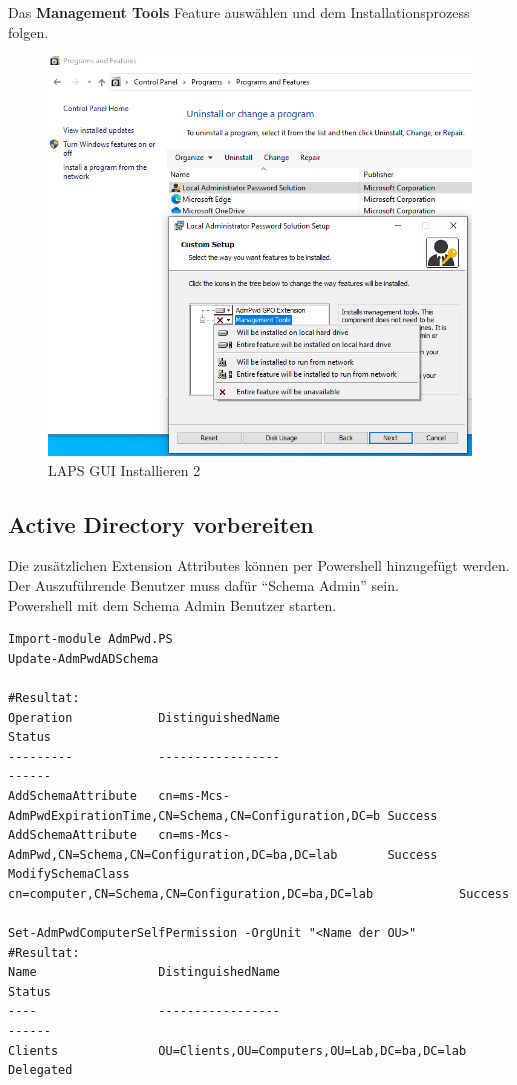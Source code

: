 Das \textbf{Management Tools} Feature auswählen und dem Installationsprozess folgen.
\begin{figure}[H]
    \centering
    \includegraphics[width=0.7\linewidth]{../img/LAPS/laps-ui-install-2.png}
    \caption{LAPS GUI Installieren 2}
\end{figure}


\subsection{Active Directory vorbereiten}
Die zusätzlichen Extension Attributes können per Powershell hinzugefügt werden.
Der Auszuführende Benutzer muss dafür ``Schema Admin'' sein.\\

Powershell mit dem Schema Admin Benutzer starten.
\begin{lstlisting}
Import-module AdmPwd.PS
Update-AdmPwdADSchema

#Resultat:
Operation            DistinguishedName                                              Status
---------            -----------------                                              ------
AddSchemaAttribute   cn=ms-Mcs-AdmPwdExpirationTime,CN=Schema,CN=Configuration,DC=b Success
AddSchemaAttribute   cn=ms-Mcs-AdmPwd,CN=Schema,CN=Configuration,DC=ba,DC=lab       Success
ModifySchemaClass    cn=computer,CN=Schema,CN=Configuration,DC=ba,DC=lab            Success

Set-AdmPwdComputerSelfPermission -OrgUnit "<Name der OU>"
#Resultat:
Name                 DistinguishedName                                              Status
----                 -----------------                                              ------
Clients              OU=Clients,OU=Computers,OU=Lab,DC=ba,DC=lab                    Delegated
\end{lstlisting}

